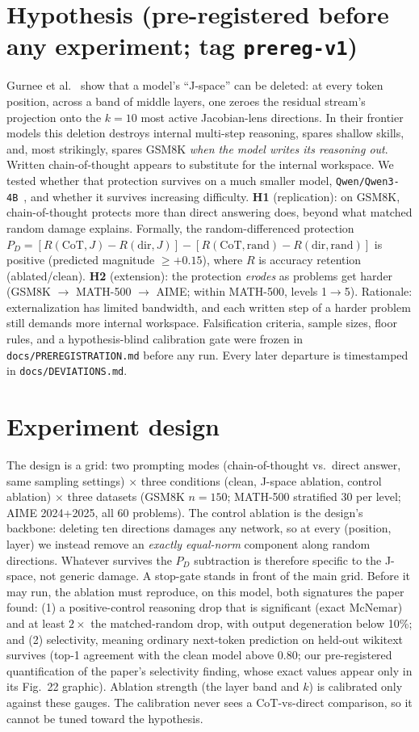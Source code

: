\documentclass[11pt]{article}
\begin{document}
\section{Hypothesis (pre-registered before any experiment; tag \texttt{prereg-v1})}
Gurnee et al.~\cite{gurnee2026} show that a model's ``J-space'' can be deleted: at every token
position, across a band of middle layers, one zeroes the residual stream's projection
onto the $k{=}10$ most active Jacobian-lens directions. In their frontier models this
deletion destroys internal multi-step reasoning, spares shallow skills, and, most
strikingly, spares GSM8K \emph{when the model writes its reasoning out}. Written
chain-of-thought appears to substitute for the internal workspace. We tested whether
that protection survives on a much smaller model, \texttt{Qwen/Qwen3-4B}~\cite{qwen3}, and whether
it survives increasing difficulty. \textbf{H1} (replication): on GSM8K, chain-of-thought
protects more than direct answering does, beyond what matched random damage explains.
Formally, the random-differenced protection
$P_D=[R(\text{CoT},J)-R(\text{dir},J)]-[R(\text{CoT},\text{rand})-R(\text{dir},\text{rand})]$
is positive (predicted magnitude $\ge +0.15$), where $R$ is accuracy retention
(ablated/clean). \textbf{H2} (extension): the protection \emph{erodes} as problems get
harder (GSM8K $\to$ MATH-500 $\to$ AIME; within MATH-500, levels 1$\to$5). Rationale:
externalization has limited bandwidth, and each written step of a harder problem still
demands more internal workspace. Falsification criteria, sample sizes, floor rules, and
a hypothesis-blind calibration gate were frozen in \texttt{docs/PREREGISTRATION.md}
before any run. Every later departure is timestamped in \texttt{docs/DEVIATIONS.md}.

\section{Experiment design}
The design is a grid: two prompting modes (chain-of-thought vs.\ direct answer, same
sampling settings) $\times$ three conditions (clean, J-space ablation, control ablation)
$\times$ three datasets (GSM8K $n{=}150$; MATH-500 stratified 30 per level; AIME
2024+2025, all 60 problems). The control ablation is the design's backbone: deleting
ten directions damages any network, so at every (position, layer) we instead remove an
\emph{exactly equal-norm} component along random directions. Whatever survives the
$P_D$ subtraction is therefore specific to the J-space, not generic damage.
A stop-gate stands in front of the main grid. Before it may run, the ablation must
reproduce, on this model, both signatures the paper found: (1) a positive-control
reasoning drop that is significant (exact McNemar) and at least $2\times$ the
matched-random drop, with output degeneration below 10\%; and (2) selectivity, meaning
ordinary next-token prediction on held-out wikitext survives (top-1 agreement with the
clean model above 0.80; our pre-registered quantification of the paper's selectivity
finding, whose exact values appear only in its Fig.~22 graphic). Ablation strength (the
layer band and $k$) is calibrated only against these gauges. The calibration never sees
a CoT-vs-direct comparison, so it cannot be tuned toward the hypothesis.
\end{document}
